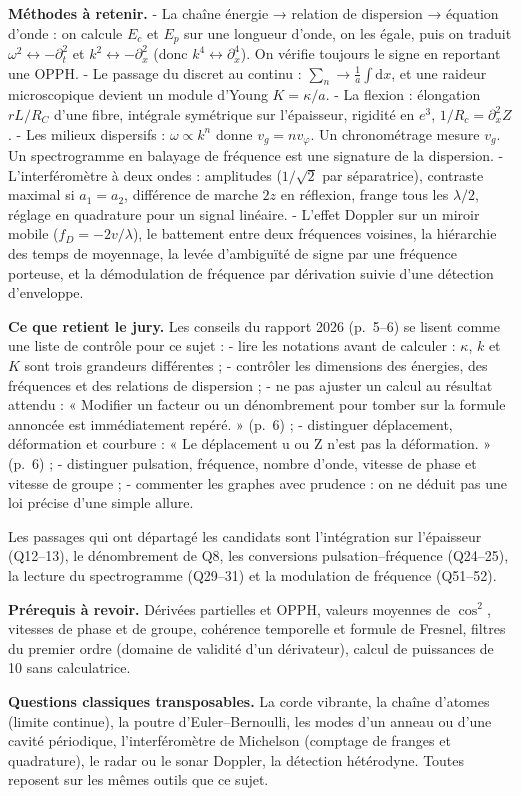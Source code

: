 \documentclass[11pt,a4paper]{article}
\begin{document}
\textbf{Méthodes à retenir.}
- La chaîne énergie → relation de dispersion → équation d'onde : on calcule \(E_c\) et \(E_p\) sur une longueur d'onde, on les égale, puis on traduit \(\omega^2\leftrightarrow-\partial_t^2\) et \(k^2\leftrightarrow-\partial_x^2\) (donc \(k^4\leftrightarrow\partial_x^4\)). On vérifie toujours le signe en reportant une OPPH.
- Le passage du discret au continu : \(\sum_n\to\frac1a\int\mathrm{d}x\), et une raideur microscopique devient un module d'Young \(K=\kappa/a\).
- La flexion : élongation \(rL/R_C\) d'une fibre, intégrale symétrique sur l'épaisseur, rigidité en \(e^3\), \(1/R_c=\partial_x^2Z\).
- Les milieux dispersifs : \(\omega\propto k^n\) donne \(v_g=nv_\varphi\). Un chronométrage mesure \(v_g\). Un spectrogramme en balayage de fréquence est une signature de la dispersion.
- L'interféromètre à deux ondes : amplitudes (\(1/\sqrt2\) par séparatrice), contraste maximal si \(a_1=a_2\), différence de marche \(2z\) en réflexion, frange tous les \(\lambda/2\), réglage en quadrature pour un signal linéaire.
- L'effet Doppler sur un miroir mobile (\(f_D=-2v/\lambda\)), le battement entre deux fréquences voisines, la hiérarchie des temps de moyennage, la levée d'ambiguïté de signe par une fréquence porteuse, et la démodulation de fréquence par dérivation suivie d'une détection d'enveloppe.

\textbf{Ce que retient le jury.} Les conseils du rapport 2026 (p.~5--6) se lisent comme une liste de contrôle pour ce sujet :
- lire les notations avant de calculer : \(\kappa\), \(k\) et \(K\) sont trois grandeurs différentes ;
- contrôler les dimensions des énergies, des fréquences et des relations de dispersion ;
- ne pas ajuster un calcul au résultat attendu : « Modifier un facteur ou un dénombrement pour tomber sur la formule annoncée est immédiatement repéré. » (p.~6) ;
- distinguer déplacement, déformation et courbure : « Le déplacement u ou Z n'est pas la déformation. » (p.~6) ;
- distinguer pulsation, fréquence, nombre d'onde, vitesse de phase et vitesse de groupe ;
- commenter les graphes avec prudence : on ne déduit pas une loi précise d'une simple allure.

Les passages qui ont départagé les candidats sont l'intégration sur l'épaisseur (Q12--13), le dénombrement de Q8, les conversions pulsation--fréquence (Q24--25), la lecture du spectrogramme (Q29--31) et la modulation de fréquence (Q51--52).

\textbf{Prérequis à revoir.} Dérivées partielles et OPPH, valeurs moyennes de \(\cos^2\), vitesses de phase et de groupe, cohérence temporelle et formule de Fresnel, filtres du premier ordre (domaine de validité d'un dérivateur), calcul de puissances de 10 sans calculatrice.

\textbf{Questions classiques transposables.} La corde vibrante, la chaîne d'atomes (limite continue), la poutre d'Euler--Bernoulli, les modes d'un anneau ou d'une cavité périodique, l'interféromètre de Michelson (comptage de franges et quadrature), le radar ou le sonar Doppler, la détection hétérodyne. Toutes reposent sur les mêmes outils que ce sujet.
\end{document}
